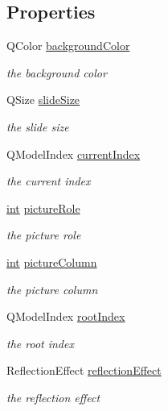 \subsection*{Properties}
\begin{DoxyCompactItemize}
\item 
Q\-Color \hyperlink{class_qxt_flow_view_a4c6fe7297ccfcefe51ca6b3d0fba8046}{background\-Color}
\begin{DoxyCompactList}\small\item\em the background color \end{DoxyCompactList}\item 
Q\-Size \hyperlink{class_qxt_flow_view_ab0e7f4857f70488c32562f64a00979fd}{slide\-Size}
\begin{DoxyCompactList}\small\item\em the slide size \end{DoxyCompactList}\item 
Q\-Model\-Index \hyperlink{class_qxt_flow_view_a3be6ca711aafd73ce054a33058a53a3f}{current\-Index}
\begin{DoxyCompactList}\small\item\em the current index \end{DoxyCompactList}\item 
\hyperlink{ioapi_8h_a787fa3cf048117ba7123753c1e74fcd6}{int} \hyperlink{class_qxt_flow_view_a5ccde7223fc2d457f05e12b78d2a3ac2}{picture\-Role}
\begin{DoxyCompactList}\small\item\em the picture role \end{DoxyCompactList}\item 
\hyperlink{ioapi_8h_a787fa3cf048117ba7123753c1e74fcd6}{int} \hyperlink{class_qxt_flow_view_af79a05af3cef867521971377ccd0c448}{picture\-Column}
\begin{DoxyCompactList}\small\item\em the picture column \end{DoxyCompactList}\item 
Q\-Model\-Index \hyperlink{class_qxt_flow_view_a28518cd1681b38850bef799fb30e5fad}{root\-Index}
\begin{DoxyCompactList}\small\item\em the root index \end{DoxyCompactList}\item 
Reflection\-Effect \hyperlink{class_qxt_flow_view_aa9f6458055ffd4ed7e3b341bf9789d25}{reflection\-Effect}
\begin{DoxyCompactList}\small\item\em the reflection effect \end{DoxyCompactList}\end{DoxyCompactItemize}


